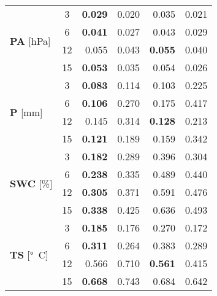 \begin{table}
\begin{tabular}{p{2.1cm}c|rr|rr}
\cline{1-6}
\multirow[c]{4}{*}{\parbox{2.1cm}{\textbf{PA} [\si{hPa}]}} & 3 & \bfseries 0.029 & 0.020 & 0.035 & 0.021 \\
 & 6 & \bfseries 0.041 & 0.027 & 0.043 & 0.029 \\
 & 12 & 0.055 & 0.043 & \bfseries 0.055 & 0.040 \\
 & 15 & \bfseries 0.053 & 0.035 & 0.054 & 0.026 \\
\cline{1-6}
\multirow[c]{4}{*}{\parbox{2.1cm}{\textbf{P} [\si{mm}]}} & 3 & \bfseries 0.083 & 0.114 & 0.103 & 0.225 \\
 & 6 & \bfseries 0.106 & 0.270 & 0.175 & 0.417 \\
 & 12 & 0.145 & 0.314 & \bfseries 0.128 & 0.213 \\
 & 15 & \bfseries 0.121 & 0.189 & 0.159 & 0.342 \\
\cline{1-6}
\multirow[c]{4}{*}{\parbox{2.1cm}{\textbf{SWC} [\si{\%}]}} & 3 & \bfseries 0.182 & 0.289 & 0.396 & 0.304 \\
 & 6 & \bfseries 0.238 & 0.335 & 0.489 & 0.440 \\
 & 12 & \bfseries 0.305 & 0.371 & 0.591 & 0.476 \\
 & 15 & \bfseries 0.338 & 0.425 & 0.636 & 0.493 \\
\cline{1-6}
\multirow[c]{4}{*}{\parbox{2.1cm}{\textbf{TS} [\si{°C}]}} & 3 & \bfseries 0.185 & 0.176 & 0.270 & 0.172 \\
 & 6 & \bfseries 0.311 & 0.264 & 0.383 & 0.289 \\
 & 12 & 0.566 & 0.710 & \bfseries 0.561 & 0.415 \\
 & 15 & \bfseries 0.668 & 0.743 & 0.684 & 0.642 \\
\cline{1-6}
\bottomrule
\end{tabular}
\end{table}
